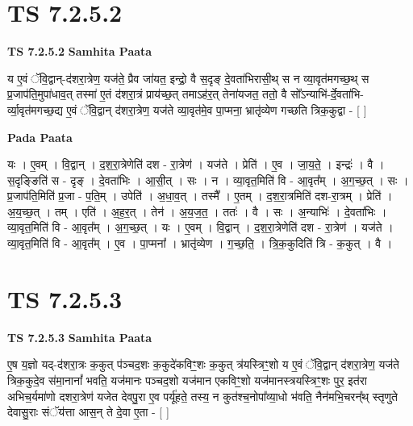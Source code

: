 \documentclass[17pt]{extarticle}
\begin{document}

\section{ TS 7.2.5.2 }

\textbf{TS 7.2.5.2 } \newline
\textbf{Samhita Paata} \newline

य ए॒वं ॅवि॒द्वान्-द॑शरा॒त्रेण॒ यज॑ते॒ प्रैव जा॑यत॒ इन्द्रो॒ वै स॒दृङ् दे॒वता॑भिरासी॒थ् स न व्या॒वृत॑मगच्छ॒थ् स प्र॒जाप॑ति॒मुपा॑धाव॒त् तस्मा॑ ए॒तं द॑शरा॒त्रं प्राय॑च्छ॒त् तमाऽह॑र॒त् तेना॑यजत॒ ततो॒ वै सो᳚ऽन्याभि॑-र्दे॒वता॑भि-र्व्या॒वृत॑मगच्छ॒द्य ए॒वं ॅवि॒द्वान् द॑शरा॒त्रेण॒ यज॑ते व्या॒वृत॑मे॒व पा॒प्मना॒ भ्रातृ॑व्येण गच्छति त्रिक॒कुद्वा - [  ] \newline

\textbf{Pada Paata} \newline

यः । ए॒वम् । वि॒द्वान् । द॒श॒रा॒त्रेणेति॑ दश - रा॒त्रेण॑ । यज॑ते । प्रेति॑ । ए॒व । जा॒य॒ते॒ । इन्द्रः॑ । वै । स॒दृङ्ङिति॑ स - दृङ् । दे॒वता॑भिः । आ॒सी॒त् । सः । न । व्या॒वृत॒मिति॑ वि - आ॒वृत᳚म् । अ॒ग॒च्छ॒त् । सः । प्र॒जाप॑ति॒मिति॑ प्र॒जा - प॒ति॒म् । उपेति॑ । अ॒धा॒व॒त् । तस्मै᳚ । ए॒तम् । द॒श॒रा॒त्रमिति॑ दश-रा॒त्रम् । प्रेति॑ । अ॒य॒च्छ॒त् । तम् । एति॑ । अ॒ह॒र॒त् । तेन॑ । अ॒य॒ज॒त॒ । ततः॑ । वै । सः । अ॒न्याभिः॑ । दे॒वता॑भिः । व्या॒वृत॒मिति॑ वि - आ॒वृत᳚म् । अ॒ग॒च्छ॒त् । यः । ए॒वम् । वि॒द्वान् । द॒श॒रा॒त्रेणेति॑ दश - रा॒त्रेण॑ । यज॑ते । व्या॒वृत॒मिति॑ वि - आ॒वृत᳚म् । ए॒व । पा॒प्मना᳚ । भ्रातृ॑व्येण । ग॒च्छ॒ति॒ । त्रि॒क॒कुदिति॑ त्रि - क॒कुत् । वै ।  \newline





\section{ TS 7.2.5.3 }

\textbf{TS 7.2.5.3 } \newline
\textbf{Samhita Paata} \newline

ए॒ष य॒ज्ञो यद्-द॑शरा॒त्रः क॒कुत् प॑ञ्चद॒शः क॒कुदे॑कविꣳ॒॒शः क॒कुत् त्र॑यस्त्रिꣳ॒॒शो य ए॒वं ॅवि॒द्वान् द॑शरा॒त्रेण॒ यज॑ते त्रिक॒कुदे॒व स॑मा॒नानां᳚ भवति॒ यज॑मानः पञ्चद॒शो यज॑मान एकविꣳ॒॒शो यज॑मानस्त्रयस्त्रिꣳ॒॒शः पुर॒ इत॑रा अभिच॒र्यमा॑णो दशरा॒त्रेण॑ यजेत देवपु॒रा ए॒व पर्यू॑हते॒ तस्य॒ न कुत॑श्च॒नोपा᳚व्या॒धो भ॑वति॒ नैन॑मभि॒चरन्᳚थ् स्तृणुते देवासु॒राः संॅय॑त्ता आस॒न् ते दे॒वा ए॒ता - [  ] \newline
\end{document}

